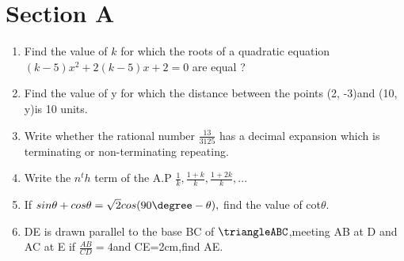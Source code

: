 \documentclass[journal,12pt,twocolumn]{IEEEtran}
\renewcommand\thesection{\arabic{section}}
\begin{document}
\section{Section A}
\renewcommand{\theequation}{\theenumi}
\begin{enumerate}[label=\thesection.\arabic*.,ref=\thesection.\theenumi]
\item Find the value of $k$ for which the roots of a quadratic equation $(k-5)x^2 + 2 (k-5)x + 2=0 $ are equal ?\\
\newline
\item Find the value of y for which the distance between the points (2, -3)and (10, y)is 10 units.\\
\newline
\item Write whether the rational number $\frac{13}{3125} $ has a decimal expansion which is terminating or non-terminating repeating.\\
\newline
\item Write the $n^th$ term of the A.P $\frac{1}{k},\frac{1+k}{k},\frac{1+2k}{k},...$\\
\newline
\item If $ sin \theta + cos\theta = \sqrt{2}cos (90\degree - \theta),$ find the value of cot$\theta$. \\
\newline
\item DE is drawn parallel to the base BC of $\triangleABC$,meeting AB at D and AC at E if $\frac{AB}{CD}=4$and CE=2cm,find AE.\\
\newline

\end{enumerate}
\end{document}

